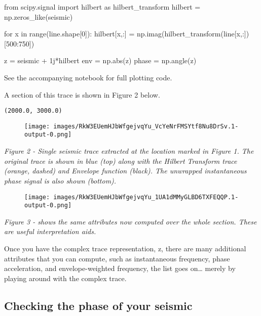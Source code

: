 \begin{code}[python]
from scipy.signal import hilbert as hilbert_transform
hilbert = np.zeros_like(seismic)

for x in range(line.shape[0]):
    hilbert[x,:] = np.imag(hilbert_transform(line[x,:])[500:750])

z = seismic + 1j*hilbert
env = np.abs(z)
phase = np.angle(z)
\end{code}

See the accompanying notebook for full plotting code.

A section of this trace is shown in Figure 2 below.



\begin{verbatim}(2000.0, 3000.0)\end{verbatim}

  \begin{figure}[ht]
    \centering
    \texttt{[image: images/RkW3EUemHJbWfgejvqYu\_VcYeNrFMSYtf8Nu8DrSv.1-output-0.png]}
  \end{figure}


\textit{Figure 2 - Single seismic trace extracted at the location marked in Figure 1. The original trace is shown in blue (top) along with the Hilbert Transform trace (orange, dashed) and Envelope function (black). The unwrapped instantaneous phase signal is also shown (bottom).}



  \begin{figure}[ht]
    \centering
    \texttt{[image: images/RkW3EUemHJbWfgejvqYu\_1UA1dMMyGLBD6TXFEQQP.1-output-0.png]}
  \end{figure}


\textit{Figure 3 - shows the same attributes now computed over the whole section. These are useful interpretation aids.}

Once you have the complex trace representation, z, there are many additional attributes that you can compute, such as instantaneous frequency, phase acceleration, and envelope-weighted frequency, the list goes on… merely by playing around with the complex trace.

\subsection*{Checking the phase of your seismic}

